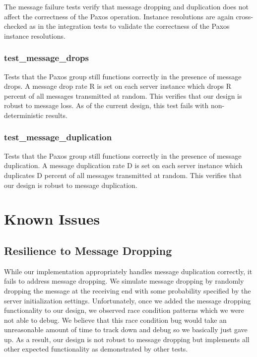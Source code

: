 \documentclass{article}
\begin{document}
The message failure tests verify that message dropping and duplication does not affect the correctness of the Paxos operation.
Instance resolutions are again cross-checked as in the integration tests to validate the correctness of the Paxos instance resolutions.

\subsubsection{test\_message\_drops}

Tests that the Paxos group still functions correctly in the presence of message drops.
A message drop rate R is set on each server instance which drops R percent of all messages transmitted at random.
This verifies that our design is robust to message loss. As of the current design, this test fails with non-deterministic results.

\subsubsection{test\_message\_duplication}

Tests that the Paxos group still functions correctly in the presence of message duplication.
A message duplication rate D is set on each server instance which duplicates D percent of all messages transmitted at random.
This verifies that our design is robust to message duplication.


\section{Known Issues}

\subsection{Resilience to Message Dropping}

While our implementation appropriately handles message duplication correctly, it fails to address message dropping.
We simulate message dropping by randomly dropping the message at the receiving end with some probability specified by the server initialization settings.
Unfortunately, once we added the message dropping functionality to our design, we observed race condition patterns which we were not able to debug.
We believe that this race condition bug would take an unreasonable amount of time to track down and debug so we basically just gave up.
As a result, our design is not robust to message dropping but implements all other expected functionality as demonstrated by other tests.
\end{document}
